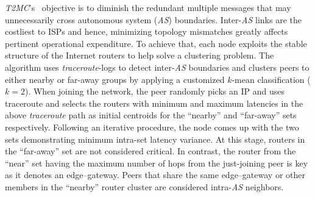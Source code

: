 \emph{T2MC}'s~\cite{SLCGZ2008} objective is to diminish the redundant multiple
messages that may unnecessarily cross autonomous system (\emph{AS}) boundaries.
Inter-\emph{AS} links are the costliest to ISPs and hence, 
minimizing topology mismatches greatly affects pertinent operational expenditure.
To achieve that, each node exploits the stable structure of
the Internet routers to help solve a clustering problem. 
The algorithm uses {\sl traceroute}-logs to detect inter-\emph{AS} boundaries 
and clusters peers to either nearby or 
far-away groups by applying a customized $k$-mean classification ($k=2$).
When joining the network, the peer randomly picks an IP and uses
traceroute and selects the routers with
minimum and maximum latencies in the above {\sl traceroute} path 
as initial centroids for the ``nearby'' and ``far-away'' sets respectively.
Following an iterative procedure, the node comes up with the two sets 
demonstrating minimum intra-set latency variance.
At this stage, routers in the ``far-away'' set are not considered critical.
% 
% 
In contrast, the router from the ``near'' set
having the maximum number of hops 
from the just-joining peer is key as it denotes an edge--gateway. 
Peers that share the same edge--gateway or other members in the ``nearby'' 
router cluster are considered intra-\emph{AS} neighbors.

